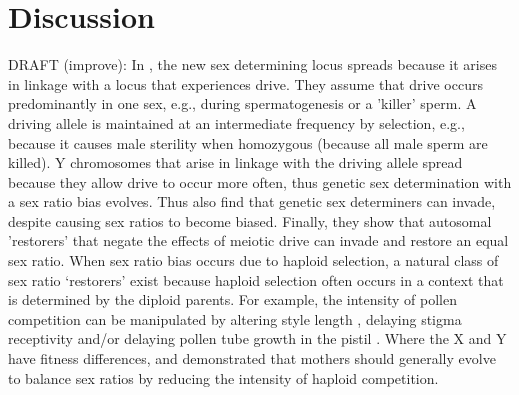 \documentclass[12pt]{article}
\begin{document}
\linenumbers
\modulolinenumbers[2]

\section*{Discussion}


DRAFT (improve): In \citet{Ubeda:2015fx}, the new sex determining locus spreads because it arises in linkage with a locus that experiences drive. They assume that drive occurs predominantly in one sex, e.g., during spermatogenesis or a 'killer' sperm. A driving allele is maintained at an intermediate frequency by selection, e.g., because it causes male sterility when homozygous (because all male sperm are killed). Y chromosomes that arise in linkage with the driving allele spread because they allow drive to occur more often, thus genetic sex determination with a sex ratio bias evolves. 
Thus \citet{Ubeda:2015fx} also find that genetic sex determiners can invade, despite causing sex ratios to become biased. 
Finally, they show that autosomal 'restorers' that negate the effects of meiotic drive can invade and restore an equal sex ratio. 
When sex ratio bias occurs due to haploid selection, a natural class of sex ratio `restorers' exist because haploid selection often occurs in a context that is determined by the diploid parents. 
For example, the intensity of pollen competition can be manipulated by altering style length \citep{Travers:2001,Lankinen:2001gc,Ruane:2009vt}, delaying stigma receptivity \citep{Galen:1986wq,Lankinen:2011if} and/or delaying pollen tube growth in the pistil \citep{Herrero:2003jf}. 
Where the X and Y have fitness differences, \citet{Hough:2013uo} and \citet{Otto:2015va} demonstrated that mothers should generally evolve to balance sex ratios by reducing the intensity of haploid competition. 
\end{document}
